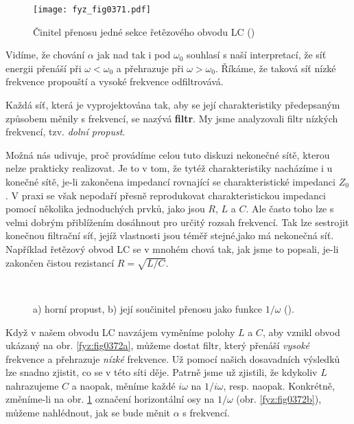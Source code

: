   \begin{figure}[ht!] %
    \centering
    \texttt{[image: fyz\_fig0371.pdf]}
    \caption{Činitel přenosu jedné sekce řetězového obvodu LC
             (\cite[s.~411]{Feynman02})}
    \label{fyz:fig0371}
  \end{figure}
  
  Vidíme, že chování \(\alpha\) jak nad tak i pod \(\omega_0\) souhlasí s naší interpretací, že síť 
  energii přenáší při \(\omega<\omega_0\) a přehrazuje při \(\omega>\omega_0\). Říkáme, že taková 
  síť nízké frekvence propouští a vysoké frekvence odfiltrovává.
  
  Každá síť, která je vyprojektována tak, aby se její charakteristiky předepsaným způsobem měnily s 
  frekvencí, se nazývá \textbf{filtr}. My jsme analyzovali filtr nízkých frekvencí, tzv. 
  \emph{dolní propust}.
  
  Možná nás udivuje, proč provádíme celou tuto diskuzi nekonečné sítě, kterou nelze prakticky 
  realizovat. Je to v tom, že tytéž charakteristiky nacházíme i u konečné sítě, je-li zakončena 
  impedancí rovnající se charakteristické impedanci \(Z_0\). V praxi se však nepodaří přesně 
  reprodukovat charakteristickou impedanci pomocí několika jednoduchých prvků, jako jsou \(R\), 
  \(L\) a \(C\). Ale často toho lze s velmi dobrým přiblížením dosáhnout pro určitý rozsah 
  frekvencí. Tak lze sestrojit konečnou filtrační síť, jejíž vlastnosti jsou téměř stejné,jako má 
  nekonečná síť. Například řetězový obvod LC se v mnohém chová tak, jak jsme to popsali, je-li 
  zakončen čistou rezistancí \(R = \sqrt{L/C}\).
    
  \begin{figure}[ht!] %
    \centering
     \\
    \caption{a) horní propust, b) její součinitel přenosu jako funkce \(1/\omega\)
             (\cite[s.~411]{Feynman02}).}
    \label{fyz:fig0372}
  \end{figure}
  
  Když v našem obvodu LC navzájem vyměníme polohy \(L\) a \(C\), aby vznikl obvod ukázaný na obr. 
  \ref{fyz:fig0372a}, můžeme dostat filtr, který přenáší \emph{vysoké} frekvence a přehrazuje 
  \emph{nízké} frekvence. Už pomocí našich dosavadních výsledků lze snadno zjistit, co se v této 
  síti děje. Patrně jsme už zjistili, že kdykoliv \(L\) nahrazujeme \(C\) a naopak, měníme každé 
  \(i\omega\) na \(1/i\omega\), resp. naopak. Konkrétně, změníme-li na obr. \ref{fyz:fig0371} 
  označení horizontální osy na \(1/\omega\) (obr. \ref{fyz:fig0372b}), můžeme nahlédnout, jak se 
  bude měnit \(\alpha\) s frekvencí. 
  
